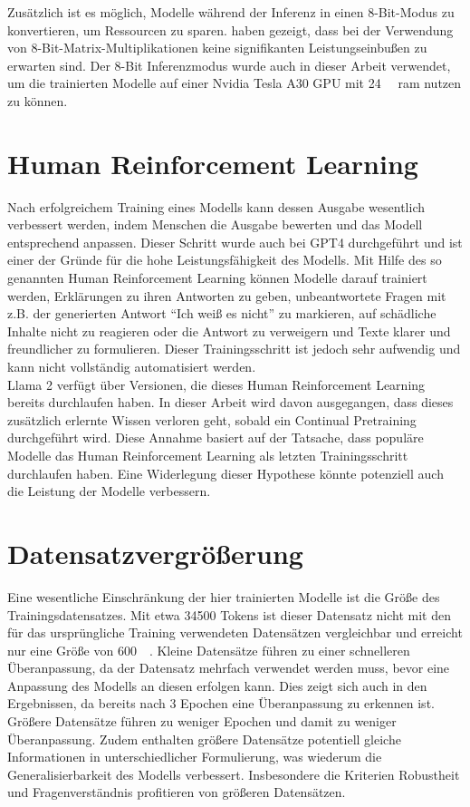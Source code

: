 Zusätzlich ist es möglich, Modelle während der Inferenz in einen 8-Bit-Modus zu konvertieren, um Ressourcen zu sparen.
\citet{8bit-inference} haben gezeigt, dass bei der Verwendung von 8-Bit-Matrix-Multiplikationen keine signifikanten Leistungseinbußen zu erwarten sind.
Der 8-Bit Inferenzmodus wurde auch in dieser Arbeit verwendet, um die trainierten Modelle auf einer Nvidia Tesla A30 GPU mit \SI{24}{\giga\byte} \ac{ram} nutzen zu können.\\

\section{Human Reinforcement Learning}
Nach erfolgreichem Training eines Modells kann dessen Ausgabe wesentlich verbessert werden, indem Menschen die Ausgabe bewerten und das Modell entsprechend anpassen.
Dieser Schritt wurde auch bei GPT4 durchgeführt und ist einer der Gründe für die hohe Leistungsfähigkeit des Modells.
Mit Hilfe des so genannten Human Reinforcement Learning können Modelle darauf trainiert werden, Erklärungen zu ihren Antworten zu geben, unbeantwortete Fragen mit z.B. der generierten Antwort \enquote{Ich weiß es nicht} zu markieren, auf schädliche Inhalte nicht zu reagieren oder die Antwort zu verweigern und Texte klarer und freundlicher zu formulieren.
Dieser Trainingsschritt ist jedoch sehr aufwendig und kann nicht vollständig automatisiert werden.\\

Llama 2 verfügt über Versionen, die dieses Human Reinforcement Learning bereits durchlaufen haben.
In dieser Arbeit wird davon ausgegangen, dass dieses zusätzlich erlernte Wissen verloren geht, sobald ein Continual Pretraining durchgeführt wird.
Diese Annahme basiert auf der Tatsache, dass populäre Modelle das Human Reinforcement Learning als letzten Trainingsschritt durchlaufen haben.
Eine Widerlegung dieser Hypothese könnte potenziell auch die Leistung der Modelle verbessern.

\section{Datensatzvergrößerung}
Eine wesentliche Einschränkung der hier trainierten Modelle ist die Größe des Trainingsdatensatzes.
Mit etwa \num{34500} Tokens ist dieser Datensatz nicht mit den für das ursprüngliche Training verwendeten Datensätzen vergleichbar und erreicht nur eine Größe von \SI{600}{\kilo\byte}. Kleine Datensätze führen zu einer schnelleren Überanpassung, da der Datensatz mehrfach verwendet werden muss, bevor eine Anpassung des Modells an diesen erfolgen kann.
Dies zeigt sich auch in den Ergebnissen, da bereits nach 3 Epochen eine Überanpassung zu erkennen ist.
Größere Datensätze führen zu weniger Epochen und damit zu weniger Überanpassung.
Zudem enthalten größere Datensätze potentiell gleiche Informationen in unterschiedlicher Formulierung, was wiederum die Generalisierbarkeit des Modells verbessert.
Insbesondere die Kriterien Robustheit und Fragenverständnis profitieren von größeren Datensätzen.\\

